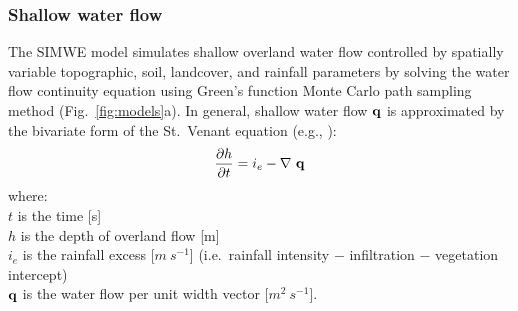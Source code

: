 \documentclass[gmd, manuscript]{copernicus}
\begin{document}

\subsubsection{Shallow water flow}

The SIMWE model simulates shallow overland water flow
controlled by spatially variable topographic, soil, landcover, 
and rainfall parameters by solving the water flow continuity equation 
using Green's function Monte Carlo path sampling method 
(Fig.~\ref{fig:models}a). 
In general, shallow water flow ${\bf q}$ is approximated by
the bivariate form of the St.~Venant equation (e.g., \cite{Julien1995}):
\begin{equation}
\label{eq:water}
{\partial h \over \partial t} =
 i_e - \nabla ~ {\bf q}
\end{equation}
{\small
\noindent
where: \\
\noindent
\hspace*{0.5em} $t$ is the time [\unit{s}] \\
\hspace*{0.5em} $h$ is the depth of overland flow [\unit{m}]\\
\hspace*{0.5em} $i_e$ is the rainfall excess [$\unit{m~s^{-1}}$]
(i.e.~rainfall intensity $-$ infiltration $-$ vegetation intercept)\\
\hspace*{0.5em} ${\bf q}$ is the water flow per unit width vector [$\unit{m}^2~\unit{s}^{-1}$]. 
}
\end{document}
